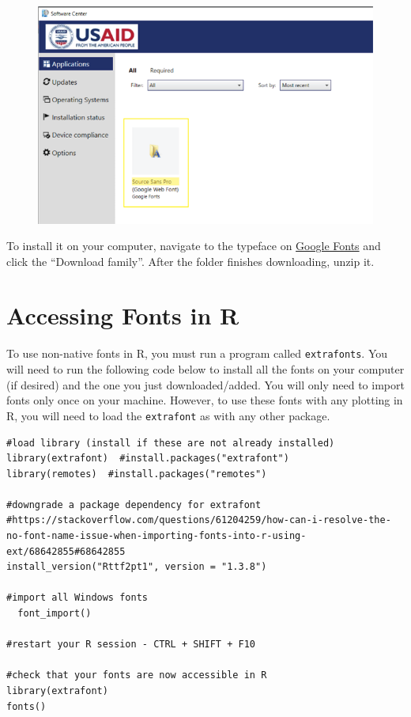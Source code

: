 \documentclass[
  letterpaper,
  DIV=11,
  numbers=noendperiod]{scrreprt}
\begin{document}
\begin{figure}

{\centering \includegraphics{./images/typeface_setup-software-center_font.png}

}

\end{figure}

To install it on your computer, navigate to the typeface on
\href{https://fonts.google.com/specimen/Source+Sans+Pro}{Google Fonts}
and click the ``Download family''. After the folder finishes
downloading, unzip it.

\hypertarget{accessing-fonts-in-r}{%
\section{Accessing Fonts in R}\label{accessing-fonts-in-r}}

To use non-native fonts in R, you must run a program called
\texttt{extrafonts}. You will need to run the following code below to
install all the fonts on your computer (if desired) and the one you just
downloaded/added. You will only need to import fonts only once on your
machine. However, to use these fonts with any plotting in R, you will
need to load the \texttt{extrafont} as with any other package.

\begin{verbatim}
#load library (install if these are not already installed)
library(extrafont)  #install.packages("extrafont")
library(remotes)  #install.packages("remotes")

#downgrade a package dependency for extrafont
#https://stackoverflow.com/questions/61204259/how-can-i-resolve-the-no-font-name-issue-when-importing-fonts-into-r-using-ext/68642855#68642855
install_version("Rttf2pt1", version = "1.3.8")

#import all Windows fonts
  font_import()
  
#restart your R session - CTRL + SHIFT + F10

#check that your fonts are now accessible in R
library(extrafont)
fonts()
\end{verbatim}
\end{document}
